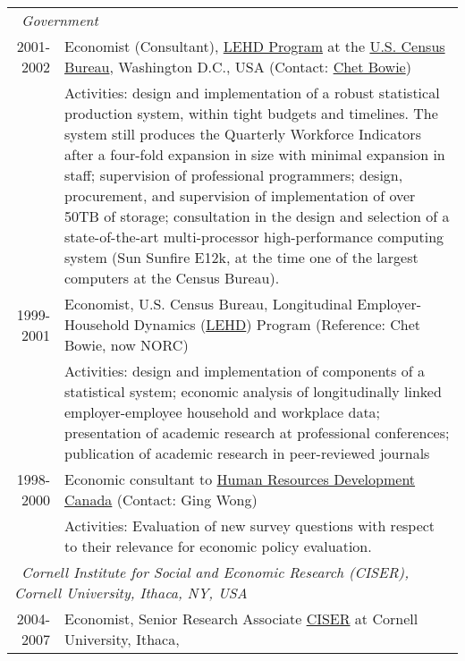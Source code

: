 \documentclass[10pt,letterpaper]{report}
\begin{document}
\begin{longtable}{rp{5in}}
\multicolumn{2}{l}{\ \it Government}\\
2001-2002    &Economist (Consultant), \href{http://lehd.dsd.census.gov}{LEHD Program} at the
\href{http://www.census.gov}{U.S. Census Bureau}, Washington D.C., USA (Contact:
\href{mailto:chester.e.bowie@census.gov}{Chet Bowie})\\%
              &Activities: design and implementation of a robust statistical
              production system, within tight budgets and timelines. The
              system still produces the Quarterly Workforce Indicators
              after a four-fold expansion in size with minimal expansion in
              staff; supervision of professional programmers; design,
              procurement, and supervision of implementation of over 50TB
              of storage; consultation in the design and selection of a
              state-of-the-art multi-processor high-performance computing
              system (Sun Sunfire E12k, at the time one of the largest
              computers at the Census Bureau).\\
1999-2001    &Economist, U.S. Census Bureau, Longitudinal
Employer-Household Dynamics (\href{http://lehd.dsd.census.gov}{LEHD})
Program (Reference: Chet Bowie, now NORC)\\%
             &Activities: design and implementation of components of a
             statistical system; economic analysis of
         longitudinally linked employer-employee household and workplace
         data; presentation of academic research at professional
         conferences; publication of academic research in peer-reviewed
         journals\\
1998-2000    &Economic consultant to
\href{http://www.hrdc-drhc.gc.ca/}{Human Resources Development Canada}
(Contact: Ging Wong)\\
             &Activities: Evaluation of new survey questions with respect to
             their relevance for economic policy evaluation.\\[.3cm]
%
\multicolumn{2}{l}{\ \it Cornell Institute for Social and Economic
  Research (CISER), Cornell University, Ithaca, NY, USA}\\
2004-2007    & Economist, Senior Research Associate 
\href{http://www.ciser.cornell.edu}{CISER} at Cornell University, Ithaca,

\end{longtable}
\end{document}
